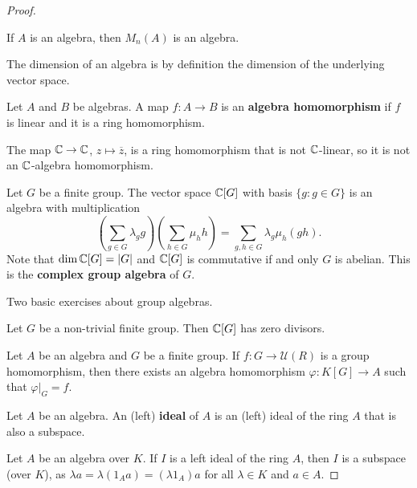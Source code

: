 \begin{proof}
\begin{example}
	If $A$ is an algebra, then $M_n(A)$ is an algebra. 	
\end{example}

The dimension of an algebra is by 
definition the dimension of the 
underlying vector space. 

\begin{definition}
	Let $A$ and $B$ be algebras. A map $f\colon A\to B$ is an \textbf{algebra homomorphism} 
	if $f$ is linear and it is a ring homomorphism.  	
\end{definition}

The map $\mathbb{C}\to\mathbb{C}$, $z\mapsto\overline{z}$, is a ring homomorphism that
is not $\mathbb{C}$-linear, so it is not an $\mathbb{C}$-algebra homomorphism. 

\begin{example}
	Let $G$ be a finite group. The vector space 
	$\mathbb{C}[G]$ with basis $\{g:g\in G\}$
	is an algebra with multiplication
	\[
	\left(\sum_{g\in G}\lambda_gg\right)\left(\sum_{h\in G}\mu_hh\right)
	=\sum_{g,h\in G}\lambda_g\mu_h(gh).
	\] 	
	Note that $\dim\mathbb{C}[G]=|G|$ and
	$\mathbb{C}[G]$ is commutative if and only $G$ is abelian. 
	This is the \textbf{complex group algebra} of $G$. 
\end{example}

Two basic exercises about group algebras.
 
\begin{exercise}
	Let $G$ be a non-trivial finite group. 
	Then $\mathbb{C}[G]$ has zero divisors. 
\end{exercise}

\begin{exercise}
	Let $A$ be an algebra and $G$ be a finite group. 
	If $f\colon G\to\mathcal{U}(R)$ is a group homomorphism, 
	then there exists an algebra homomorphism 
	$\varphi\colon K[G]\to A$ such that $\varphi|_G=f$.   	
\end{exercise}


\begin{definition}
	Let $A$ be an algebra. An (left) \textbf{ideal} of $A$ is an 
	(left) ideal of the ring $A$ that is also a subspace. 
\end{definition}

Let $A$ be an algebra over $K$. If $I$ is a left ideal of the ring $A$, then 
$I$ is a subspace (over $K$), as $\lambda a=\lambda(1_Aa)=(\lambda 1_A)a$ 
for all $\lambda\in K$ and $a\in A$.  
%


\end{proof}
